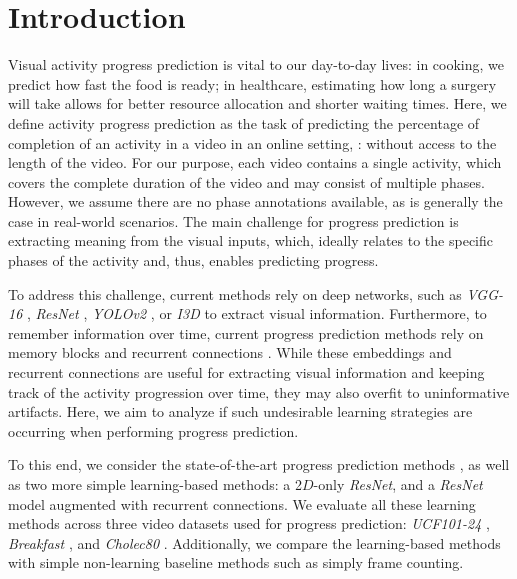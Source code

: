\section{Introduction}
\label{sec:intro} 
Visual activity progress prediction is vital to our day-to-day lives: \eg in cooking, we predict how fast the food is ready; in healthcare, estimating how long a surgery will take allows for better resource allocation and shorter waiting times. 
Here, we define activity progress prediction as the task of predicting the percentage of completion of an activity in a video in an online setting, \ie: without access to the length of the video.   
For our purpose, each video contains a single activity, which covers the complete duration of the video and may consist of multiple phases.
However, we assume there are no phase annotations available, as is generally the case in real-world scenarios. 
The main challenge for progress prediction is extracting meaning from the visual inputs, which, ideally relates to the specific phases of the activity and, thus, enables predicting progress.

To address this challenge, current methods rely on deep networks, such as \textsl{VGG-16} \cite{simonyan2015}, \textsl{ResNet} \cite{he2015}, \textsl{YOLOv2} \cite{redmon2016}, or \textsl{I3D} \cite{carreira2018} to extract visual information. 
Furthermore, to remember information over time, current progress prediction methods \cite{becattini2017,twinanda2019} rely on memory blocks and recurrent connections \cite{hochreiter1997long}.
While these embeddings and recurrent connections are useful for extracting visual information and keeping track of the activity progression over time, they may also overfit to uninformative artifacts. 
Here, we aim to analyze if such undesirable learning strategies are occurring when performing progress prediction.

To this end, we consider the state-of-the-art progress prediction methods \cite{becattini2017,kukleva2019,twinanda2019}, as well as two more simple learning-based methods: a 2$D$-only \textsl{ResNet}, and a \textsl{ResNet} model augmented with recurrent connections. 
We evaluate all these learning methods across three video datasets used for progress prediction: \textsl{UCF101-24} \cite{soomro2012}, \textsl{Breakfast} \cite{kuehne2014, kuehne2016}, and \textsl{Cholec80} \cite{twinanda2016}.
Additionally, we compare the learning-based methods with simple non-learning baseline methods such as simply frame counting.

